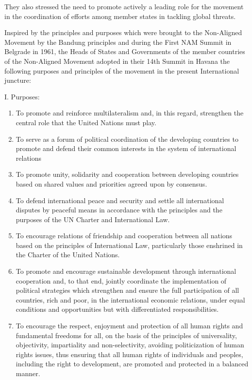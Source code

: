 \documentclass[
  openany]{book}
\begin{document}
They also stressed the need to promote actively a leading role for the movement in the coordination of efforts among member states in tackling global threats.

Inspired by the principles and purposes which were brought to the Non-Aligned Movement by the Bandung principles and during the First NAM Summit in Belgrade in 1961, the Heads of States and Governments of the member countries of the Non-Aligned Movement adopted in their 14th Summit in Havana the following purposes and principles of the movement in the present International juncture:

I. Purposes:

\begin{enumerate}
\def\labelenumi{\alph{enumi}.}
\item
  To promote and reinforce multilateralism and, in this regard, strengthen the central role that the United Nations must play.
\item
  To serve as a forum of political coordination of the developing countries to promote and defend their common interests in the system of international relations
\item
  To promote unity, solidarity and cooperation between developing countries based on shared values and priorities agreed upon by consensus.
\item
  To defend international peace and security and settle all international disputes by peaceful means in accordance with the principles and the purposes of the UN Charter and International Law.
\item
  To encourage relations of friendship and cooperation between all nations based on the principles of International Law, particularly those enshrined in the Charter of the United Nations.
\item
  To promote and encourage sustainable development through international cooperation and, to that end, jointly coordinate the implementation of political strategies which strengthen and ensure the full participation of all countries, rich and poor, in the international economic relations, under equal conditions and opportunities but with differentiated responsibilities.
\item
  To encourage the respect, enjoyment and protection of all human rights and fundamental freedoms for all, on the basis of the principles of universality, objectivity, impartiality and non-selectivity, avoiding politicization of human rights issues, thus ensuring that all human rights of individuals and peoples, including the right to development, are promoted and protected in a balanced manner.

\end{enumerate}
\end{document}
